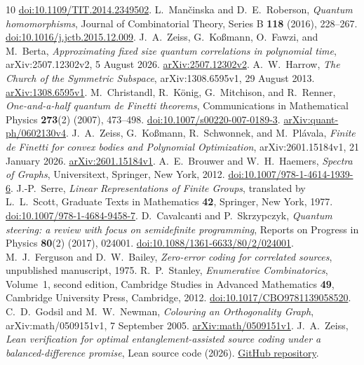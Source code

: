 \documentclass[11pt,a4paper]{article}
\numberwithin{equation}{section}
\numberwithin{figure}{section}
\numberwithin{table}{section}
\numberwithin{footnote}{section}
\theoremstyle{informal}\newtheorem*{informaltheorem}{Informal theorem}
\theoremstyle{definition}\newtheorem{example}{Example}[section]
\theoremstyle{remark}\newtheorem{remark}[theorem]{Remark}
\begin{document}
\begin{thebibliography}{10}
\href{https://doi.org/10.1109/TIT.2014.2349502}{doi:10.1109/TIT.2014.2349502}.
L.~Man\v{c}inska and D.~E.~Roberson,
\emph{Quantum homomorphisms},
Journal of Combinatorial Theory, Series B \textbf{118} (2016), 228--267.
\href{https://doi.org/10.1016/j.jctb.2015.12.009}{doi:10.1016/j.jctb.2015.12.009}.
J.~A.~Zeiss, G.~Ko\ss mann, O.~Fawzi, and M.~Berta,
\emph{Approximating fixed size quantum correlations in polynomial time},
arXiv:2507.12302v2, 5 August 2026.
\href{https://arxiv.org/abs/2507.12302v2}{arXiv:2507.12302v2}.
A.~W.~Harrow,
\emph{The Church of the Symmetric Subspace},
arXiv:1308.6595v1, 29 August 2013.
\href{https://arxiv.org/abs/1308.6595v1}{arXiv:1308.6595v1}.
M.~Christandl, R.~K\"onig, G.~Mitchison, and R.~Renner,
\emph{One-and-a-half quantum de Finetti theorems},
Communications in Mathematical Physics \textbf{273}(2) (2007), 473--498.
\href{https://doi.org/10.1007/s00220-007-0189-3}{doi:10.1007/s00220-007-0189-3}.
\href{https://arxiv.org/abs/quant-ph/0602130v4}{arXiv:quant-ph/0602130v4}.
J.~A.~Zeiss, G.~Ko\ss mann, R.~Schwonnek, and M.~Pl\'avala,
\emph{Finite de Finetti for convex bodies and Polynomial Optimization},
arXiv:2601.15184v1, 21 January 2026.
\href{https://arxiv.org/abs/2601.15184v1}{arXiv:2601.15184v1}.
A.~E.~Brouwer and W.~H.~Haemers,
\emph{Spectra of Graphs},
Universitext, Springer, New York, 2012.
\href{https://doi.org/10.1007/978-1-4614-1939-6}{doi:10.1007/978-1-4614-1939-6}.
J.-P.~Serre,
\emph{Linear Representations of Finite Groups},
translated by L.~L.~Scott,
Graduate Texts in Mathematics \textbf{42}, Springer, New York, 1977.
\href{https://doi.org/10.1007/978-1-4684-9458-7}{doi:10.1007/978-1-4684-9458-7}.
D.~Cavalcanti and P.~Skrzypczyk,
\emph{Quantum steering: a review with focus on semidefinite programming},
Reports on Progress in Physics \textbf{80}(2) (2017), 024001.
\href{https://doi.org/10.1088/1361-6633/80/2/024001}{doi:10.1088/1361-6633/80/2/024001}.
M.~J.~Ferguson and D.~W.~Bailey,
\emph{Zero-error coding for correlated sources},
unpublished manuscript, 1975.
R.~P.~Stanley,
\emph{Enumerative Combinatorics}, Volume~1, second edition,
Cambridge Studies in Advanced Mathematics \textbf{49},
Cambridge University Press, Cambridge, 2012.
\href{https://doi.org/10.1017/CBO9781139058520}{doi:10.1017/CBO9781139058520}.
C.~D.~Godsil and M.~W.~Newman,
\emph{Colouring an Orthogonality Graph},
arXiv:math/0509151v1, 7 September 2005.
\href{https://arxiv.org/abs/math/0509151v1}{arXiv:math/0509151v1}.
J.~A.~Zeiss,
\emph{Lean verification for optimal entanglement-assisted source coding
under a balanced-difference promise},
Lean source code (2026).
\href{https://github.com/JuliusAZeiss/Lean-Verification-for-Optimal-entanglement-assisted-source-coding-under-a-balanced-di-erence-promise}{GitHub repository}.
\end{thebibliography}
\end{document}
